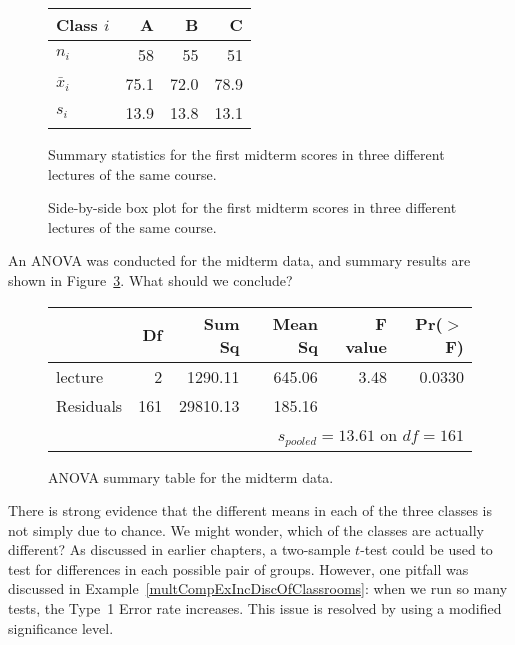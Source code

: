 \begin{figure}
\centering
\begin{tabular}{lrrr}
  \hline
Class $i$	& A	& B	& C \\ 
  \hline
$n_i$		& 58	& 55	& 51 \\ 
$\bar{x}_i$	& 75.1	& 72.0	& 78.9 \\ 
$s_i$		& 13.9	& 13.8	& 13.1 \\ 
\hline
\end{tabular}
\caption{Summary statistics for the first midterm scores
    in three different lectures of the same course.}
\label{summaryStatisticsForClassTestData}
\end{figure}

\begin{figure}
  \centering
  \caption{Side-by-side box plot for the first midterm
      scores in three different  lectures of the same course.}
  \label{classDataSBSBoxPlot}
\end{figure}

\begin{exercisewrap}
\begin{nexercise}
\label{exerExaminingAnovaSummaryTableForMidtermData}%
An ANOVA was conducted for the midterm data,
and summary results are shown in
Figure~\ref{anovaSummaryTableForMidtermData}.
What should we conclude?\footnotemark{}
\end{nexercise}
\end{exercisewrap}

\begin{figure}
\centering
\begin{tabular}{lrrrrr}
  \hline
 & Df & Sum Sq & Mean Sq & F value & Pr($>$F) \\ 
  \hline
lecture & 2 & 1290.11 & 645.06 & 3.48 & 0.0330 \\ 
  Residuals & 161 & 29810.13 & 185.16 &  &  \\ 
   \hline
\multicolumn{6}{r}{$s_{pooled}=13.61$ on $df=161$}
\end{tabular}
\caption{ANOVA summary table for the midterm data.}
\label{anovaSummaryTableForMidtermData}
\end{figure}

There is strong evidence that the different means in each
of the three classes is not simply due to chance.
We might wonder, which of the classes are actually different?
As discussed in earlier chapters, a two-sample $t$-test
could be used to test for differences in each possible pair
of groups.
However, one pitfall was discussed in
Example~\vref{multCompExIncDiscOfClassrooms}:
when we run so many tests, the Type~1 Error rate increases.
This issue is resolved by using a modified significance level.

